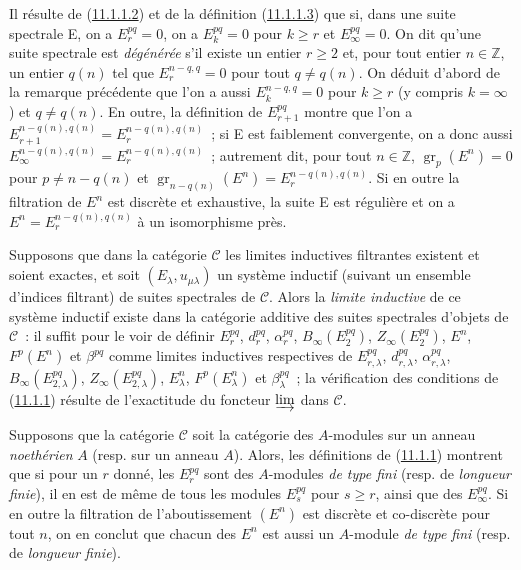 \begin{env}[11.1.6]
\label{0.11.1.6-fr}
Il résulte de (\hyperref[0.11.1.1.2-fr]{11.1.1.2}) et de la définition
(\hyperref[0.11.1.1.3-fr]{11.1.1.3}) que si, dans une suite spectrale E, on a
$E_r^{pq}=0$, on a $E_k^{pq}=0$ pour $k\geq r$ et $E_\infty^{pq}=0$. On dit
qu'une suite spectrale est \emph{dégénérée} s'il existe un entier $r\geq2$ et,
pour tout entier $n\in\mathbb Z$, un entier $q(n)$ tel que
$E_r^{n-q,q}=0$ pour tout $q\ne q(n)$. On déduit d'abord de la remarque
précédente que l'on a aussi $E_k^{n-q,q}=0$ pour $k\geq r$ (y compris
$k=\infty$) et $q\ne q(n)$. En outre, la définition de $E_{r+1}^{pq}$ montre
que l'on a
$E_{r+1}^{n-q(n),q(n)}=E_r^{n-q(n),q(n)}$~; si E est faiblement convergente,
on a donc aussi
$E_\infty^{n-q(n),q(n)}=E_r^{n-q(n),q(n)}$~; autrement dit, pour tout
$n\in\mathbb Z$, $\operatorname{gr}_p(E^n)=0$ pour $p\ne n-q(n)$ et
$\operatorname{gr}_{n-q(n)}(E^n)=E_r^{n-q(n),q(n)}$. Si en outre la filtration
de $E^n$ est discrète et exhaustive, la suite E est régulière et on a
$E^n=E_r^{n-q(n),q(n)}$ à un isomorphisme près.
\end{env}

\begin{env}[11.1.7]
\label{0.11.1.7-fr}
Supposons que dans la catégorie $\mathcal C$ les limites inductives filtrantes
existent et soient exactes, et soit $(E_\lambda,u_{\mu\lambda})$ un système
inductif (suivant un ensemble d'indices filtrant) de suites spectrales de
$\mathcal C$. Alors la \emph{limite inductive} de ce système inductif existe
dans la catégorie additive des suites spectrales d'objets de $\mathcal C$~:
il suffit pour le voir de définir $E_r^{pq}$, $d_r^{pq}$, $\alpha_r^{pq}$,
$B_\infty(E_2^{pq})$, $Z_\infty(E_2^{pq})$, $E^n$, $F^p(E^n)$ et
$\beta^{pq}$ comme limites inductives respectives de $E_{r,\lambda}^{pq}$,
$d_{r,\lambda}^{pq}$, $\alpha_{r,\lambda}^{pq}$,
$B_\infty(E_{2,\lambda}^{pq})$, $Z_\infty(E_{2,\lambda}^{pq})$,
$E_\lambda^n$, $F^p(E_\lambda^n)$ et $\beta_\lambda^{pq}$~; la vérification
des conditions de (\hyperref[0.11.1.1-fr]{11.1.1}) résulte de l'exactitude du
foncteur $\varinjlim$ dans $\mathcal C$.
\end{env}

\begin{remark}[11.1.8]
\label{0.11.1.8-fr}
Supposons que la catégorie $\mathcal C$ soit la catégorie des $A$-modules sur
un anneau \emph{noethérien} $A$ (resp. sur un anneau $A$). Alors, les
définitions de (\hyperref[0.11.1.1-fr]{11.1.1}) montrent que si pour un $r$
donné, les $E_r^{pq}$ sont des $A$-modules \emph{de type fini} (resp. de
\emph{longueur finie}), il en est de même de tous les modules $E_s^{pq}$ pour
$s\geq r$, ainsi que des $E_\infty^{pq}$. Si en outre la filtration de
l'aboutissement $(E^n)$ est discrète et co-discrète pour tout $n$, on en
conclut que chacun des $E^n$ est aussi un $A$-module \emph{de type fini}
(resp. de \emph{longueur finie}).
\end{remark}

